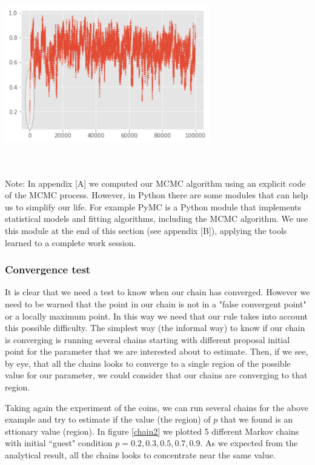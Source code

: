 \documentclass[onecolumn,           %
               showpacs,            %
               preprintnumbers,     %
               aps,                 %
               prl,          	    %
               letterpaper,             %
               superscriptaddress,      %
               nofootinbib,         %
               tightenlines,        %
               floats,floatfix      %
               ,usenatbib,
               ]{revtex4-1}
\begin{document}
\begin{minipage}{\textwidth}
\centering
\includegraphics[height=6cm]{chain1.png}
\label{chain1}
\end{minipage}\\ $ $ \\

Note: In appendix [A] we computed our MCMC algorithm using an explicit code of the MCMC process. However, in Python there are some modules that can help us to simplify our life. For example PyMC is a Python module that implements statistical models and fitting algorithms, including the MCMC algorithm. We use this module at the end of this section (see appendix [B]), applying the tools learned to a complete work session.

\subsubsection{Convergence test} 
It is clear that we need a test to know when our chain has converged. However we need to be warned that the point in our chain is not in a "false convergent point" or a locally maximum point. In this way we need that our rule takes into account this possible difficulty. The simplest way (the informal way) to know if our chain is converging is running several chains starting with different proposal initial point for the parameter that we are interested about to estimate. Then, if we see, by eye, that all the chains looks to converge to a single region of the possible value for our parameter, we could consider that our chains are converging to that region. 

 Taking again the experiment of the coins, we can run several chains for the above example and try to estimate if the value (the region) of $p$ that we found is an sttionary value (region). In figure \ref{chain2} we plotted 5 different Markov chains with initial ``guest" condition $p=0.2,0.3,0.5,0.7,0.9$. As we expected from the analytical result, all the chains looks to concentrate near the same value.
\end{document}
